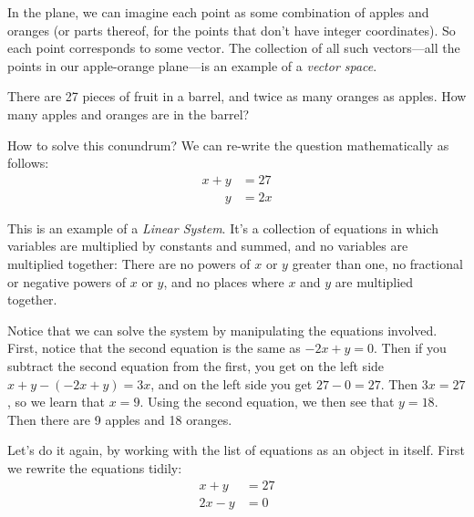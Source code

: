 \vspace{2mm}
\begin{center}
\end{center}
In the plane, we can imagine each point as some combination of apples and oranges (or parts thereof, for the points that don't have integer coordinates).  So each point corresponds to some vector.  The collection of all such vectors---all the points in our apple-orange plane---is an example of a \emph{vector space}.

\begin{example}  There are 27 pieces of fruit in a barrel, and twice as many oranges as apples.  How many apples and oranges are in the barrel?

How to solve this conundrum?  We can re-write the question mathematically as follows:
\begin{align*}
	x+y & = 27 \\
	\phantom{x+}y & = 2x
\end{align*}
\end{example}

This is an example of a \emph{Linear System}.  It's a collection of equations in which variables are multiplied by constants and summed, and no variables are multiplied together:  There are no powers of $x$ or $y$ greater than one, no fractional or negative powers of $x$ or $y$, and no places where $x$ and $y$ are multiplied together.

Notice that we can solve the system by manipulating the equations involved.  First, notice that the second equation is the same as $-2x+y=0$.  Then if you subtract the second equation from the first, you get on the left side $x+y - (-2x+y) = 3x$, and on the left side you get $27-0=27$.  Then $3x=27$, so we learn that $x=9$.  Using the second equation, we then see that $y=18$.  Then there are 9 apples and 18 oranges.

Let's do it again, by working with the list of equations as an object in itself.  First we rewrite the equations tidily:
\begin{align*}
	x+y & = 27 \\
	2x-y & = 0
\end{align*}

